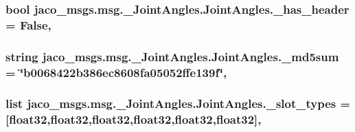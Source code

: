 \subsubsection[{\texorpdfstring{\+\_\+has\+\_\+header}{_has_header}}]{\setlength{\rightskip}{0pt plus 5cm}bool jaco\+\_\+msgs.\+msg.\+\_\+\+Joint\+Angles.\+Joint\+Angles.\+\_\+has\+\_\+header = False\hspace{0.3cm}{\ttfamily [static]}, {\ttfamily [private]}}\hypertarget{classjaco__msgs_1_1msg_1_1__JointAngles_1_1JointAngles_aa8cc8f192158b491cebfe2700025cb01}{}\label{classjaco__msgs_1_1msg_1_1__JointAngles_1_1JointAngles_aa8cc8f192158b491cebfe2700025cb01}
\subsubsection[{\texorpdfstring{\+\_\+md5sum}{_md5sum}}]{\setlength{\rightskip}{0pt plus 5cm}string jaco\+\_\+msgs.\+msg.\+\_\+\+Joint\+Angles.\+Joint\+Angles.\+\_\+md5sum = \char`\"{}b0068422b386ec8608fa05052ffe139f\char`\"{}\hspace{0.3cm}{\ttfamily [static]}, {\ttfamily [private]}}\hypertarget{classjaco__msgs_1_1msg_1_1__JointAngles_1_1JointAngles_a6eea3f6d65b9a05aa85bc43855b5e59e}{}\label{classjaco__msgs_1_1msg_1_1__JointAngles_1_1JointAngles_a6eea3f6d65b9a05aa85bc43855b5e59e}
\subsubsection[{\texorpdfstring{\+\_\+slot\+\_\+types}{_slot_types}}]{\setlength{\rightskip}{0pt plus 5cm}list jaco\+\_\+msgs.\+msg.\+\_\+\+Joint\+Angles.\+Joint\+Angles.\+\_\+slot\+\_\+types = \mbox{[}\textquotesingle{}float32\textquotesingle{},\textquotesingle{}float32\textquotesingle{},\textquotesingle{}float32\textquotesingle{},\textquotesingle{}float32\textquotesingle{},\textquotesingle{}float32\textquotesingle{},\textquotesingle{}float32\textquotesingle{}\mbox{]}\hspace{0.3cm}{\ttfamily [static]}, {\ttfamily [private]}}\hypertarget{classjaco__msgs_1_1msg_1_1__JointAngles_1_1JointAngles_aa42bcf08a8fd843da6b23c66fdc2148b}{}\label{classjaco__msgs_1_1msg_1_1__JointAngles_1_1JointAngles_aa42bcf08a8fd843da6b23c66fdc2148b}


